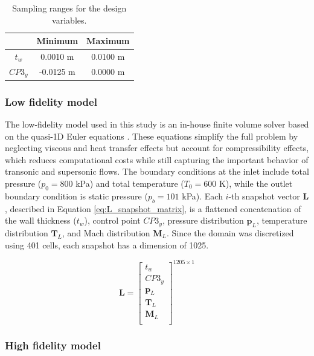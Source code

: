 \documentclass[10pt,oneside,a4paper,twocolumn]{article}
\begin{document}
\begin{table}[h]
\centering
\begin{tabular}{ccc}
\hline
& \textbf{Minimum} & \textbf{Maximum} \\
\hline
\hline
$t_w$ & 0.0010 m & 0.0100 m \\
$CP3_y$ & -0.0125 m & 0.0000 m\\
\hline
\end{tabular}
\caption{Sampling ranges for the design variables.}
\label{tab:lhs}
\end{table}

\subsubsection{Low fidelity model}

The low-fidelity model used in this study is an in-house finite volume solver based on the quasi-1D Euler equations \cite{Hirsch2007-ug}. These equations simplify the full problem by neglecting viscous and heat transfer effects but account for compressibility effects, which reduces computational costs while still capturing the important behavior of transonic and supersonic flows. The boundary conditions at the inlet include total pressure ($p_0=800$ kPa) and total temperature ($T_0=600$ K), while the outlet boundary condition is static pressure ($p_b=101$ kPa). Each $i$-th snapshot vector $\mathbf{L}$, described in Equation \eqref{eq:L_snapshot_matrix}, is a flattened concatenation of the wall thickness ($t_w$), control point $CP3_y$, pressure distribution $\mathbf{p}_L$, temperature distribution $\mathbf{T}_L$, and Mach distribution $\mathbf{M}_L$. Since the domain was discretized using 401 cells, each snapshot has a dimension of 1025.

\begin{equation}
\mathbf{L} = 
\begin{bmatrix}
    t_w \\
    CP3_y \\
    \mathbf{p}_L\\
    \mathbf{T}_L \\
    \mathbf{M}_L \\
\end{bmatrix}^{1205 \times 1}
    \label{eq:L_snapshot_matrix}
\end{equation}

\subsubsection{High fidelity model}
\end{document}
